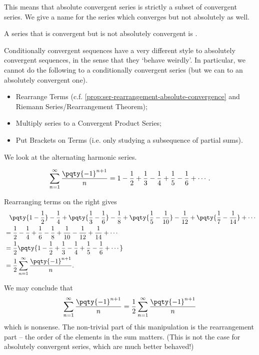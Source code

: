 This means that absolute convergent series is strictly a subset of convergent series. We give a name for the series which converges but not absolutely as well.

\begin{definition}
    \label{def:ser-conditional-convergence}%
    A series that is convergent but is not absolutely convergent is .
\end{definition}

Conditionally convergent sequences have a very different style to absolutely convergent sequences, in the sense that they `behave weirdly'. In particular, we cannot do the following to a conditionally convergent series (but we can to an absolutely convergent one).

\begin{itemize}
    \item Rearrange Terms (c.f. \autoref{prop:ser-rearrangement-absolute-convergence} and Riemann Series/Rearrangement Theorem);
    \item Multiply series to a Convergent Product Series;
    \item Put Brackets on Terms (i.e. only studying a subsequence of partial sums).
\end{itemize}

\begin{example}
    \label{ex:ser-rearrange-alternating-harmonic}%
    We look at the alternating harmonic series.

    \[
        \sum_{n = 1}^{\infty} \frac{\pqty{-1}^{n + 1}}{n} = 1 - \frac{1}{2} + \frac{1}{3} - \frac{1}{4} + \frac{1}{5} - \frac{1}{6} + \cdots.
    \]

    Rearranging terms on the right gives
    \begin{align*}
        &\phantom{=} \pqty{1 - \frac{1}{2}} - \frac{1}{4} + \pqty{\frac{1}{3} - \frac{1}{6}} - \frac{1}{8} + \pqty{\frac{1}{5} - \frac{1}{10}} - \frac{1}{12} + \pqty{\frac{1}{7} - \frac{1}{14}} + \cdots \\
        &= \frac{1}{2} - \frac{1}{4} + \frac{1}{6} - \frac{1}{8} + \frac{1}{10} - \frac{1}{12} + \frac{1}{14} + \cdots \\
        &= \frac{1}{2} \pqty{1 - \frac{1}{2} + \frac{1}{3} - \frac{1}{4} + \frac{1}{5} - \frac{1}{6} + \cdots} \\
        &= \frac{1}{2} \sum_{n = 1}^{\infty} \frac{\pqty{-1}^{n + 1}}{n}.
    \end{align*}

    We may conclude that
    \[
        \sum_{n = 1}^{\infty} \frac{\pqty{-1}^{n + 1}}{n} = \frac{1}{2}  \sum_{n = 1}^{\infty} \frac{\pqty{-1}^{n + 1}}{n}
    \]
    which is nonsense. The non-trivial part of this manipulation is the rearrangement part -- the order of the elements in the sum matters. (This is not the case for absolutely convergent series, which are much better behaved!)
\end{example}

